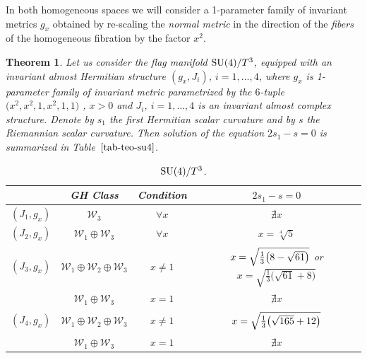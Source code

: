 \documentclass[pdftex]{sigma}%
\numberwithin{equation}{section}
\newtheorem{Theorem}{Theorem}[section]
\begin{document}
In both homogeneous spaces we will consider a 1-parameter family of invariant metrics $g_x$ obtained by re-scaling the {\it normal metric} in the direction of the {\it fibers} of the homogeneous fibration by the factor $x^2$.

\begin{Theorem} \label{teo-su4-t}
Let us consider the flag manifold ${\rm SU}(4)/T^3$, equipped with an invariant almost Hermitian structure $(g_x,J_i)$, $i=1,\ldots, 4$, where $g_x$ is 1-parameter family of invariant metric parametrized by the $6$-tuple $\big(x^{2},x^{2},1,x^{2},1,1\big)$ , $x>0$ and $J_i$, $i=1,\ldots, 4$ is an invariant almost complex structure. Denote by $s_1$ the first Hermitian scalar curvature and by $s$ the Riemannian scalar curvature. Then solution of the equation $2s_1-s=0$ is summarized in Table~$\ref{tab-teo-su4}$.

\begin{table}[h]\setlength{\tabcolsep}{4.5pt}
\renewcommand{\arraystretch}{1.2}
\centering
\caption{${\rm SU}(4)/T^3$.} \label{tab-teo-su4}
\begin{tabular}{c|c|c|c}\hline
 & GH Class & Condition & $2s_{1}-s=0$
 \\
\hline
$(J_{1},g_x)$ & $\mathcal{W}_{3}$ & $\forall x$ & $\nexists x$
\\
\hline
$(J_{2},g_x)$ & $\mathcal{W}_{1}\oplus \mathcal{W}_{3}$ & $\forall x$ & $x=\sqrt[4]{5}$
\\
\hline
$(J_{3},g_x)$ & $\mathcal{W}_{1}\oplus \mathcal{W}_{2}\oplus\mathcal{W}_{3}$ & $x\neq1$ & $\vphantom{\dfrac13^2}x=\sqrt{\frac{1}{3} \big(8-\sqrt{61}\big)}$ or $x=\sqrt{\frac{1}{3} \big(\sqrt{61}+8\big)}$
\\
 & $\mathcal{W}_{1}\oplus\mathcal{W}_{3}$ & $x=1$ & $\nexists x$
 \\
\hline
$(J_{4},g_x)$ & $\mathcal{W}_{1}\oplus \mathcal{W}_{2}\oplus\mathcal{W}_{3}$ & $x\neq1$ & $\vphantom{\dfrac13^2}x=\sqrt{\frac{1}{3} \big(\sqrt{165}+12\big)}$
\\
 & $\mathcal{W}_{1}\oplus\mathcal{W}_{3}$ & $x=1$ & $\nexists x$
 \\
\hline
\end{tabular}
\end{table}
\end{Theorem}
\end{document}
